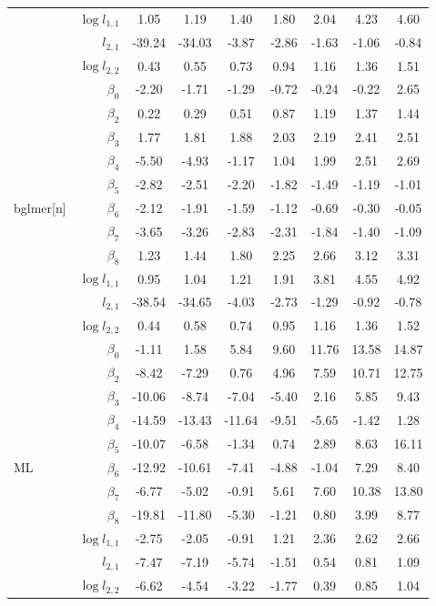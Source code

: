 \documentclass[11pt, a4paper]{article}
\newcommand*{\bb}{\boldsymbol}
\theoremstyle{example} \newtheorem{example}{Example}[section]
\theoremstyle{theorem} \newtheorem{theorem}{Theorem}[section]
\theoremstyle{theorem }\newtheorem{proposition}{Proposition}[section]
\theoremstyle{theorem }\newtheorem{corollary}{Corollary}[section]
\def\\bbeta{\bb{\\bbeta}}
\begin{document}
\begin{table}[H]
\begin{tabular}{lrccccccc}
		& $\log l_{1,1}$ & 1.05 & 1.19 & 1.40 & 1.80 & 2.04 & 4.23 & 4.60 \\ 
		& $l_{2,1}$ & -39.24 & -34.03 & -3.87 & -2.86 & -1.63 & -1.06 & -0.84 \\ 
		& $\log l_{2,2}$ & 0.43 & 0.55 & 0.73 & 0.94 & 1.16 & 1.36 & 1.51 \\ 
		\cmidrule{3-9} 
		& $\beta_0$ & -2.20 & -1.71 & -1.29 & -0.72 & -0.24 & -0.22 & 2.65 \\ 
		& $\beta_2$ & 0.22 & 0.29 & 0.51 & 0.87 & 1.19 & 1.37 & 1.44 \\ 
		& $\beta_3$ & 1.77 & 1.81 & 1.88 & 2.03 & 2.19 & 2.41 & 2.51 \\ 
		& $\beta_4$ & -5.50 & -4.93 & -1.17 & 1.04 & 1.99 & 2.51 & 2.69 \\ 
		& $\beta_5$ & -2.82 & -2.51 & -2.20 & -1.82 & -1.49 & -1.19 & -1.01 \\ 
		bglmer[n] & $\beta_6$ & -2.12 & -1.91 & -1.59 & -1.12 & -0.69 & -0.30 & -0.05 \\ 
		& $\beta_7$ & -3.65 & -3.26 & -2.83 & -2.31 & -1.84 & -1.40 & -1.09 \\ 
		& $\beta_8$ & 1.23 & 1.44 & 1.80 & 2.25 & 2.66 & 3.12 & 3.31 \\ 
		& $\log l_{1,1}$ & 0.95 & 1.04 & 1.21 & 1.91 & 3.81 & 4.55 & 4.92 \\ 
		& $l_{2,1}$ & -38.54 & -34.65 & -4.03 & -2.73 & -1.29 & -0.92 & -0.78 \\ 
		& $\log l_{2,2}$ & 0.44 & 0.58 & 0.74 & 0.95 & 1.16 & 1.36 & 1.52 \\ 
		\cmidrule{3-9} 
		& $\beta_0$ & -1.11 & 1.58 & 5.84 & 9.60 & 11.76 & 13.58 & 14.87 \\ 
		& $\beta_2$ & -8.42 & -7.29 & 0.76 & 4.96 & 7.59 & 10.71 & 12.75 \\ 
		& $\beta_3$ & -10.06 & -8.74 & -7.04 & -5.40 & 2.16 & 5.85 & 9.43 \\ 
		& $\beta_4$ & -14.59 & -13.43 & -11.64 & -9.51 & -5.65 & -1.42 & 1.28 \\ 
		& $\beta_5$ & -10.07 & -6.58 & -1.34 & 0.74 & 2.89 & 8.63 & 16.11 \\ 
		ML & $\beta_6$ & -12.92 & -10.61 & -7.41 & -4.88 & -1.04 & 7.29 & 8.40 \\ 
		& $\beta_7$ & -6.77 & -5.02 & -0.91 & 5.61 & 7.60 & 10.38 & 13.80 \\ 
		& $\beta_8$ & -19.81 & -11.80 & -5.30 & -1.21 & 0.80 & 3.99 & 8.77 \\ 
		& $\log l_{1,1}$ & -2.75 & -2.05 & -0.91 & 1.21 & 2.36 & 2.62 & 2.66 \\ 
		& $l_{2,1}$ & -7.47 & -7.19 & -5.74 & -1.51 & 0.54 & 0.81 & 1.09 \\ 
		& $\log l_{2,2}$ & -6.62 & -4.54 & -3.22 & -1.77 & 0.39 & 0.85 & 1.04 \\ 
		\bottomrule 
	\end{tabular}
\end{table}
\end{document}
